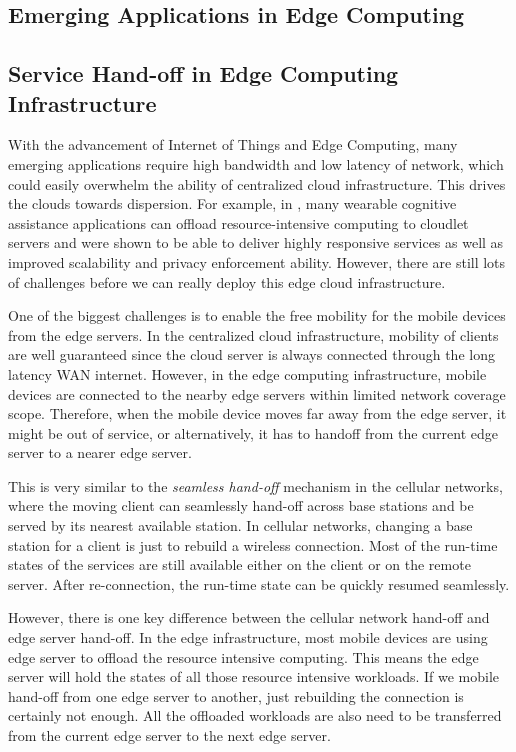 
\subsection{Emerging Applications in Edge Computing}



\subsection{Service Hand-off in Edge Computing Infrastructure}

With the advancement of Internet of Things and Edge Computing, many emerging applications require high bandwidth and low latency of network, which could easily overwhelm the ability of centralized cloud infrastructure. This drives the clouds towards dispersion. For example, in \cite{satya2017edge}, many wearable cognitive assistance applications can offload resource-intensive computing to cloudlet servers and were shown to be able to deliver highly responsive services as well as improved scalability and privacy enforcement ability.  However, there are still lots of challenges before we can really deploy this edge cloud infrastructure. 

One of the biggest challenges is to enable the free mobility for the mobile devices from the edge servers. In the centralized cloud infrastructure, mobility of clients are well guaranteed since the cloud server is always connected through the long latency WAN internet. However, in the edge computing infrastructure, mobile devices are connected to the nearby edge servers within limited network coverage scope. Therefore, when the mobile device moves far away from the edge server, it might be out of service, or alternatively, it has to handoff from the current edge server to a nearer edge server. 

This is very similar to the \textit{seamless hand-off } mechanism in the cellular networks, where the moving client can seamlessly hand-off across base stations and be served by its nearest available station. In cellular networks, changing a base station for a client is just to rebuild a wireless connection. Most of the run-time states of the services are still available either on the client or on the remote server. After re-connection, the run-time state can be quickly resumed seamlessly. 

However, there is one key difference between the cellular network hand-off and edge server hand-off. In the edge infrastructure, most mobile devices are using edge server to offload the resource intensive computing. This means the edge server will hold the states of all those resource intensive workloads. If we mobile hand-off from one edge server to another, just rebuilding the connection is certainly not enough. All the offloaded workloads are also need to be transferred from the current edge server to the next edge server.  


